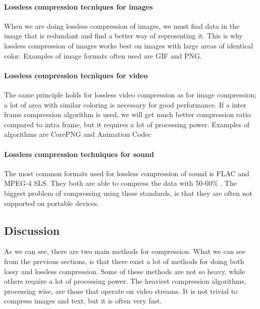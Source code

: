 \paragraph{Lossless compression tecniques for images}  \hfill \newline
When we are doing lossless compression of images, we must find data in the image that is redundant and find a better way of representing it. This is why lossless compression of images works best on images with large areas of identical color. Examples of image formats often used are GIF and PNG. \cite{bib:GIF} \cite{bib:gifsicle} \cite{bib:PNG}

\paragraph{Lossless compression tecniques for video}  \hfill \newline
The same principle holds for lossless video compression as for image compression; a lot of area with similar coloring is necessary for good performance. If a inter frame compression algorithm is used, we will get much better compression ratio compared to intra frame, but it requires a lot of processing power. Examples of algorithms are CorePNG and Animation Codec \cite{bib:corePNG} \cite{bib:animationcodec}


\paragraph{Lossless compression techniques for sound}
The most common formats used for lossless compression of sound is FLAC and MPEG-4 SLS. They both are able to compress the data with 50-60\% . The biggest problem of compressing using these standards, is that they are often not supported on portable devices.  \cite{bib:FLAC}


\subsection{Discussion}
As we can see, there are two main methods for compression. What we can see from the previous sections, is that there exist a lot of methods for doing both lossy and lossless compression. Some of these methods are not so heavy, while others require a lot of processing power. The heaviest compression algorithms, processing wise, are those that operate on video streams. It is not trivial to compress images and text, but it is often very fast.

